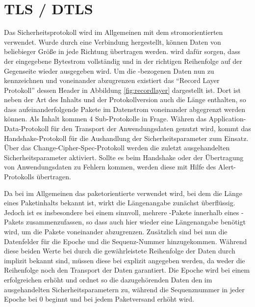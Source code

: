 \chapter{TLS / DTLS}
\label{chp:dtls}

Das Sicherheitsprotokoll  \cite{rfc5246} wird im Allgemeinen mit dem stromorientierten  verwendet.
Wurde durch  eine Verbindung hergestellt, können Daten von beliebieger Größe in jede Richtung
übertragen werden.  wird dafür sorgen, dass der eingegebene Bytestrom vollständig und in der
richtigen Reihenfolge auf der Gegenseite wieder ausgegeben wird. Um die -bezogenen Daten nun
zu kennzeichnen und voneinander abzugrenzen existiert das "`Record Layer Protokoll"' dessen Header in Abbildung \ref{fig:recordlayer}
dargestellt ist. Dort ist neben der Art des Inhalts und der Protokollversion auch die Länge enthalten, so dass
aufeinanderfolgende Pakete im Datenstrom voneinander abgegrenzt werden können. Als Inhalt kommen 4 Sub-Protokolle
in Frage. Währen das Application-Data-Protokoll für den Transport der Anwendungsdaten genutzt wird, kommt
das Handshake-Protokoll für die Aushandlung der Sicherheitsparameter zum Einsatz. Über das Change-Cipher-Spec-Protokoll
werden die zuletzt ausgehandelten Sicherheitsparameter aktiviert. Sollte es beim Handshake oder der Übertragung
von Anwendungsdaten zu Fehlern kommen, werden diese mit Hilfe des Alert-Protokolls übertragen.

Da bei  \cite{rfc6347} im Allgemeinen das paketorientierte  verwendet wird, bei dem die Länge eines
Paketinhalts bekannt ist, wirkt die Längenangabe zunächst überflüssig. Jedoch ist es insbesondere bei einem
 sinnvoll, mehrere -Pakete innerhalb eines -Pakets zusammenzufassen,
so dass auch hier wieder eine Längenangabe benötigt wird, um die Pakete voneinander abzugrenzen.
Zusätzlich sind bei  nun die Datenfelder für die Epoche und die Sequenz-Nummer hinzugekommen.
Während diese beiden Werte bei  durch die gewährleistete Reihenfolge der Daten durch 
implizit bekannt sind, müssen diese bei  explizit angegeben werden, da  weder die
Reihenfolge noch den Transport der Daten garantiert. Die Epoche wird bei einem erfolgreichen 
erhöht und ordnet so die dazugehörenden Daten den im  ausgehandelten Sicherheitsparametern zu,
während die Sequenznummer in jeder Epoche bei 0 beginnt und bei jedem Paketversand erhöht wird.

